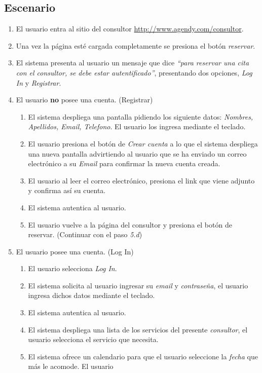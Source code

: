 \documentclass[letter, 10pt]{article}
\begin{document}
\subsection{Escenario}
\begin{enumerate}
   \item El usuario entra al sitio del consultor \url{http://www.agendy.com/consultor}.
   \item Una vez la página esté cargada completamente se presiona el botón \emph{reservar}.
   \item El sistema presenta al usuario un mensaje que dice \emph{``para reservar una cita con el consultor,
	se debe estar autentificado''}, presentando dos opciones, \emph{Log In} y \emph{Registrar}.
   \item El usuario \textbf{no} posee una cuenta. (Registrar)
   \begin{enumerate}
	\item El sistema despliega una pantalla pidiendo los siguiente datos:
		\emph{Nombres, Apellidos, Email, Telefono}. El usuario los ingresa mediante el teclado.
	\item El usuario presiona el botón de \emph{Crear cuenta} a lo que el sistema despliega una nueva pantalla
		advirtiendo al usuario que se ha enviado un correo electrónico a su \emph{Email} para confirmar
		la nueva cuenta creada.
	\item El usuario al leer el correo electrónico, presiona el link que viene adjunto y confirma así su cuenta.
	\item El sistema autentica al usuario.
	\item El usuario vuelve a la página del consultor y presiona el botón de reservar. (Continuar con el paso \emph{5.d})
   \end{enumerate}
   \item El usuario posee una cuenta. (Log In)
   \begin{enumerate}
	\item El usuario selecciona \emph{Log In}.
	\item El sistema solicita al usuario ingresar su \emph{email} y \emph{contraseña}, el usuario ingresa
		dichos datos mediante el teclado.
	\item El sistema autentica al usuario.
	\item El sistema despliega una lista de los servicios del presente \emph{consultor}, el usuario selecciona
		el servicio que necesita. 
	\item El sistema ofrece un calendario para que el usuario seleccione la \emph{fecha} que más le acomode. El usuario

\end{enumerate}
\end{enumerate}
\end{document}
